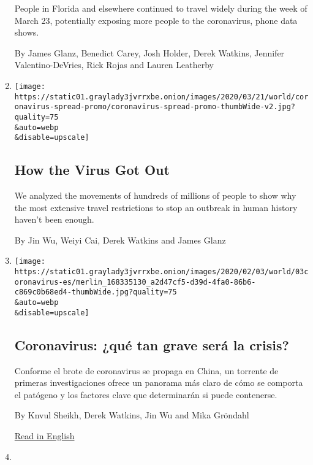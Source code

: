 \begin{enumerate}
  People in Florida and elsewhere continued to travel widely during the
  week of March 23, potentially exposing more people to the coronavirus,
  phone data shows.

  By James Glanz, Benedict Carey, Josh Holder, Derek Watkins, Jennifer
  Valentino-DeVries, Rick Rojas and Lauren Leatherby
\item
  \href{/interactive/2020/03/22/world/coronavirus-spread.html}{}

  \texttt{[image: https://static01.graylady3jvrrxbe.onion/images/2020/03/21/world/coronavirus-spread-promo/coronavirus-spread-promo-thumbWide-v2.jpg?quality=75\\\&auto=webp\\\&disable=upscale]}

  \hypertarget{how-the-virus-got-out}{%
  \subsection{How the Virus Got Out}\label{how-the-virus-got-out}}

  We analyzed the movements of hundreds of millions of people to show
  why the most extensive travel restrictions to stop an outbreak in
  human history haven't been enough.

  By Jin Wu, Weiyi Cai, Derek Watkins and James Glanz
\item
  \href{/es/2020/02/04/espanol/mundo/coronavirus-vacuna-viaje.html}{}

  \texttt{[image: https://static01.graylady3jvrrxbe.onion/images/2020/02/03/world/03coronavirus-es/merlin\_168335130\_a2d47cf5-d39d-4fa0-86b6-c869c0b68ed4-thumbWide.jpg?quality=75\\\&auto=webp\\\&disable=upscale]}

  \hypertarget{coronavirus-quuxe9-tan-grave-seruxe1-la-crisis}{%
  \subsection{Coronavirus: ¿qué tan grave será la
  crisis?}\label{coronavirus-quuxe9-tan-grave-seruxe1-la-crisis}}

  Conforme el brote de coronavirus se propaga en China, un torrente de
  primeras investigaciones ofrece un panorama más claro de cómo se
  comporta el patógeno y los factores clave que determinarán si puede
  contenerse.

  By Knvul Sheikh, Derek Watkins, Jin Wu and Mika Gröndahl

  \href{https://www.nytimes3xbfgragh.onion/interactive/2020/world/asia/china-coronavirus-contain.html}{Read
  in English}
\item
  \href{/interactive/2020/02/01/us/politics/democratic-presidential-campaign-donors.html}{}


\end{enumerate}
